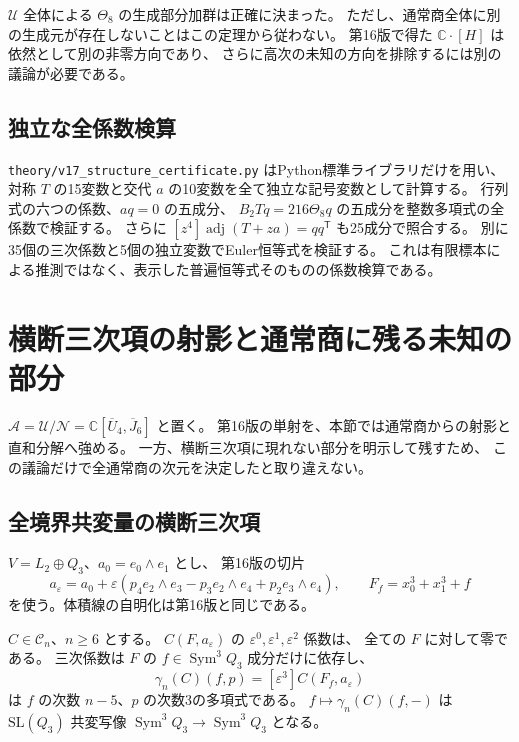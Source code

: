 \begin{remark}[この結論が決めていないこと]
$\mathcal U$ 全体による $\Theta_8$ の生成部分加群は正確に決まった。
ただし、通常商全体に別の生成元が存在しないことはこの定理から従わない。
第16版で得た $\mathbb C\cdot[H]$ は依然として別の非零方向であり、
さらに高次の未知の方向を排除するには別の議論が必要である。
\end{remark}

\subsection{独立な全係数検算}

\nolinkurl{theory/v17_structure_certificate.py} はPython標準ライブラリだけを用い、
対称 $T$ の15変数と交代 $a$ の10変数を全て独立な記号変数として計算する。
行列式の六つの係数、$aq=0$ の五成分、
$B_2Tq=216\Theta_8q$ の五成分を整数多項式の全係数で検証する。
さらに $[z^4]\operatorname{adj}(T+za)=qq^{\mathsf T}$ も25成分で照合する。
別に35個の三次係数と5個の独立変数でEuler恒等式を検証する。
これは有限標本による推測ではなく、表示した普遍恒等式そのものの係数検算である。




\section{横断三次項の射影と通常商に残る未知の部分}
\label{sec:v17-normal-projection}

$\mathcal A=\mathcal U/\mathcal N
=\mathbb C[\overline U_4,\overline J_6]$ と置く。
第16版の単射を、本節では通常商からの射影と直和分解へ強める。
一方、横断三次項に現れない部分を明示して残すため、
この議論だけで全通常商の次元を決定したと取り違えない。

\subsection{全境界共変量の横断三次項}

$V=L_2\oplus Q_3$、$a_0=e_0\wedge e_1$ とし、
第16版の切片
\[
 a_\varepsilon=a_0+
 \varepsilon(p_4e_2\wedge e_3-p_3e_2\wedge e_4+p_2e_3\wedge e_4),
 \qquad F_f=x_0^3+x_1^3+f
\]
を使う。体積線の自明化は第16版と同じである。

\begin{lemma}[三次未満の横断項は現れない]
\label{lem:v17-covariant-normal-order}
$C\in\mathcal C_n$、$n\ge6$ とする。
$C(F,a_\varepsilon)$ の $\varepsilon^0,\varepsilon^1,\varepsilon^2$ 係数は、
全ての $F$ に対して零である。
三次係数は $F$ の $f\in\operatorname{Sym}^3Q_3$ 成分だけに依存し、
\[
 \gamma_n(C)(f,p)
 =[\varepsilon^3]C(F_f,a_\varepsilon)
\]
は $f$ の次数 $n-5$、$p$ の次数3の多項式である。
$f\mapsto\gamma_n(C)(f,-)$ は $\mathrm{SL}(Q_3)$ 共変写像
$\operatorname{Sym}^3Q_3\to\operatorname{Sym}^3Q_3$ となる。
\end{lemma}

